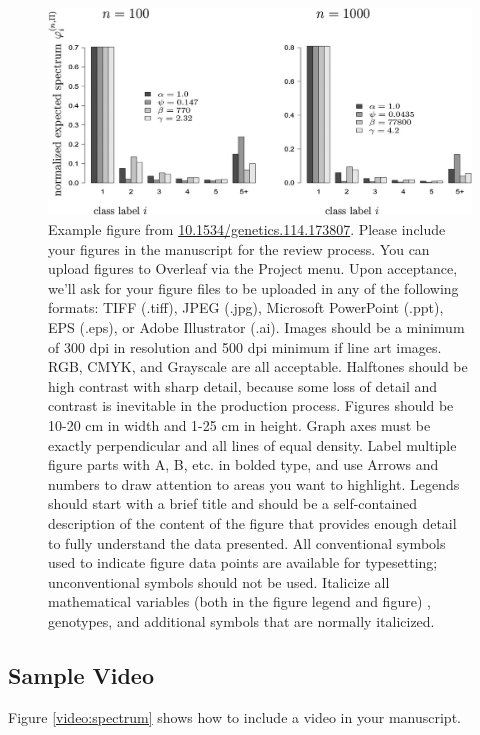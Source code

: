 \documentclass[9pt,twocolumn,twoside]{gsajnl}
\begin{document}
\begin{figure}[htbp]
\centering
\includegraphics[width=\linewidth]{example-figure}
\caption{Example figure from \url{10.1534/genetics.114.173807}. Please include your figures in the manuscript for the review process. You can upload figures to Overleaf via the Project menu. Upon acceptance, we'll ask for your figure files to be uploaded in any of the following formats: TIFF (.tiff), JPEG (.jpg), Microsoft PowerPoint (.ppt), EPS (.eps), or Adobe Illustrator (.ai).  Images should be a minimum of 300 dpi in resolution and 500 dpi minimum if line art images.  RGB, CMYK, and Grayscale are all acceptable. Halftones should be high contrast with sharp detail, because some loss of detail and contrast is inevitable in the production process. Figures should be 10-20 cm in width and 1-25 cm in height. Graph axes must be exactly perpendicular and all lines of equal density.
Label multiple figure parts with A, B, etc. in bolded type, and use Arrows and numbers to draw attention to areas you want to highlight. Legends should start with a brief title and should be a self-contained description of the content of the figure that provides enough detail to fully understand the data presented. All conventional symbols used to indicate figure data points are available for typesetting; unconventional symbols should not be used. Italicize all mathematical variables (both in the figure legend and figure) , genotypes, and additional symbols that are normally italicized.  
}%
\label{fig:spectrum}
\end{figure}

\subsection*{Sample Video}

Figure \ref{video:spectrum} shows how to include a video in your manuscript.
\end{document}
